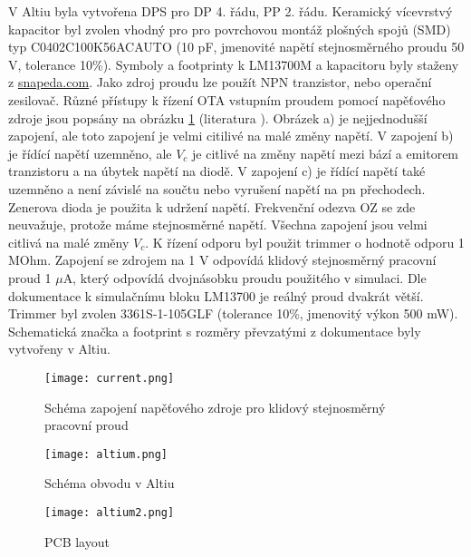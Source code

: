 \noindent V Altiu byla vytvořena DPS pro DP 4. řádu, PP 2. řádu. Keramický vícevrstvý kapacitor byl zvolen vhodný pro pro povrchovou montáž plošných spojů (SMD) typ C0402C100K56ACAUTO (10 pF, jmenovité napětí stejnosměrného proudu 50 V, tolerance 10\%). Symboly a footprinty k LM13700M a kapacitoru byly staženy z \url{snapeda.com}. Jako zdroj proudu lze použít NPN tranzistor, nebo operační zesilovač. Různé přístupy k řízení OTA vstupním proudem pomocí napěťového zdroje jsou popsány na obrázku \ref{s:DC} (literatura \cite{22}). Obrázek a) je nejjednodušší zapojení, ale toto zapojení je velmi citilivé na malé změny napětí. V zapojení b) je řídící napětí uzemněno, ale $V_c$ je citlivé na změny napětí mezi bází a emitorem tranzistoru a na úbytek napětí na diodě. V zapojení c) je řídící napětí také uzemněno a není závislé na součtu nebo vyrušení napětí na pn přechodech. Zenerova dioda je použita k udržení napětí. Frekvenční odezva OZ se zde neuvažuje, protože máme stejnosměrné napětí. Všechna zapojení jsou velmi citlivá na malé změny $V_c$. K řízení odporu byl použit trimmer o hodnotě odporu 1 MOhm. Zapojení se zdrojem na 1 V odpovídá klidový stejnosměrný pracovní proud 1 $\mu$A, který odpovídá dvojnásobku proudu použitého v simulaci. Dle dokumentace k simulačnímu bloku LM13700 je reálný proud dvakrát větší. Trimmer byl zvolen 3361S-1-105GLF (tolerance 10\%, jmenovitý výkon 500 mW). Schematická značka a footprint s rozměry převzatými z dokumentace byly vytvořeny v Altiu.
\begin{figure}[h]
\centering
\texttt{[image: current.png]}
\caption{Schéma zapojení napěťového zdroje pro klidový stejnosměrný pracovní proud \label{s:DC}}
\end{figure}
\begin{figure}[h]
\centering
\texttt{[image: altium.png]}
\caption{Schéma obvodu v Altiu}
\end{figure}
\begin{figure}[h]
\centering
\texttt{[image: altium2.png]}
\caption{PCB layout}
\end{figure}